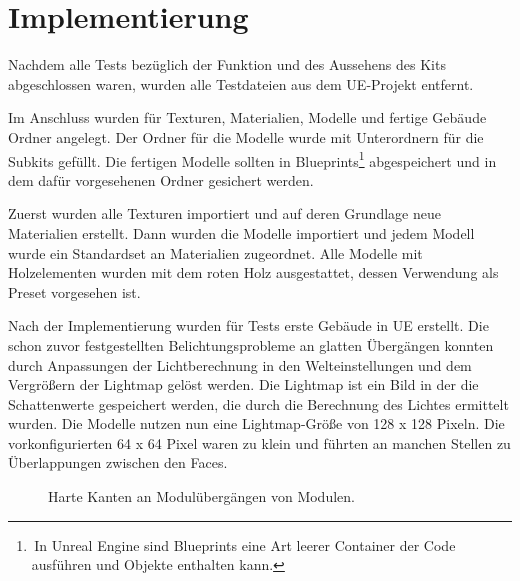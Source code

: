 \section{Implementierung}\label{implementierung2}
Nachdem alle Tests bezüglich der Funktion und des Aussehens des Kits abgeschlossen waren, wurden alle Testdateien aus dem UE-Projekt entfernt.
\par
Im Anschluss wurden für Texturen, Materialien, Modelle und fertige Gebäude Ordner angelegt. Der Ordner für die Modelle wurde mit Unterordnern für die Subkits gefüllt. Die fertigen Modelle sollten in Blueprints\footnote{\,In Unreal Engine sind Blueprints eine Art leerer Container der Code ausführen und Objekte enthalten kann.} abgespeichert und in dem dafür vorgesehenen Ordner gesichert werden.
\par
Zuerst wurden alle Texturen importiert und auf deren Grundlage neue Materialien erstellt. Dann wurden die Modelle importiert und jedem Modell wurde ein Standardset an Materialien zugeordnet. Alle Modelle mit Holzelementen wurden mit dem roten Holz ausgestattet, dessen Verwendung als Preset vorgesehen ist.
\par
Nach der Implementierung wurden für  Tests erste Gebäude in UE erstellt. Die schon zuvor festgestellten Belichtungsprobleme an glatten Übergängen konnten durch Anpassungen der Lichtberechnung in den Welteinstellungen und dem Vergrößern der Lightmap gelöst werden. Die Lightmap ist ein Bild in der die Schattenwerte gespeichert werden, die durch die Berechnung des Lichtes ermittelt wurden. Die Modelle nutzen nun eine Lightmap-Größe von 128 x 128 Pixeln. Die vorkonfigurierten 64 x 64 Pixel waren zu klein und führten an manchen Stellen zu Überlappungen zwischen den Faces.
\begin{figure}[H]
\centering
  \caption{Harte Kanten an Modulübergängen von Modulen.}
	\label{LichtProblem}
\end{figure}
